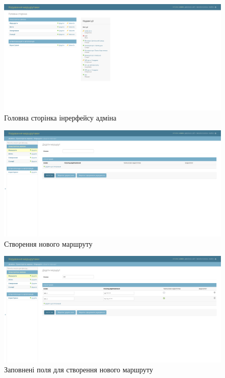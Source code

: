 \begin{figure}[!h]
	\centering
	\includegraphics[scale=0.35]{content/chapters/4-results/assets/img/admin_main.png}
	\caption{Головна сторінка інрерфейсу адміна}
	\label{fig:admin_main_page}
\end{figure}

\begin{figure}[!h]
	\centering
	\includegraphics[scale=0.35]{content/chapters/4-results/assets/img/admin_create_r.png}
	\caption{Створення нового маршруту}
	\label{fig:roure_creation_page}
\end{figure}


\begin{figure}[!h]
	\centering
	\includegraphics[scale=0.35]{content/chapters/4-results/assets/img/admin_create_R_filled.png}
	\caption{Заповнені поля для створення нового маршруту}
	\label{fig:route_creation_filled_page}
\end{figure}



